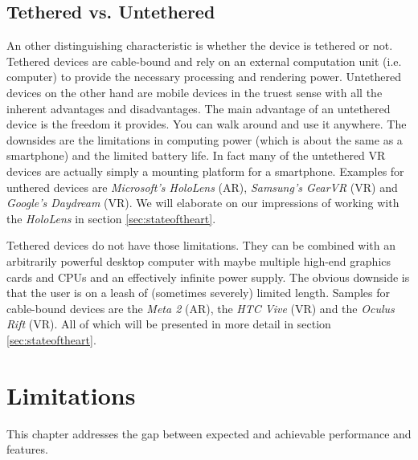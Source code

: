 \documentclass[11pt, a4paper]{IEEEtran}
\begin{document}
\subsection{Tethered vs. Untethered}
An other distinguishing characteristic is whether the device is tethered or not. Tethered devices are cable-bound and rely on an external computation unit (i.e. computer) to provide the necessary processing and rendering power. Untethered devices on the other hand are mobile devices in the truest sense with all the inherent advantages and disadvantages. The main advantage of an untethered device is the freedom it provides. You can walk around and use it anywhere. The downsides are the limitations in computing power (which is about the same as a smartphone) and the limited battery life. In fact many of the untethered VR devices are actually simply a mounting platform for a smartphone. Examples for unthered devices are \textit{Microsoft's HoloLens} (AR), \textit{Samsung's GearVR} (VR) and \textit{Google's Daydream} (VR). We will elaborate on our impressions of working with the \textit{HoloLens} in section \ref{sec:stateoftheart}.

Tethered devices do not have those limitations. They can be combined with an arbitrarily powerful desktop computer with maybe multiple high-end graphics cards and CPUs and an effectively infinite power supply. The obvious downside is that the user is on a leash of (sometimes severely) limited length. Samples for cable-bound devices are the \textit{Meta 2} (AR), the \textit{HTC Vive} (VR) and the \textit{Oculus Rift} (VR). All of which will be presented in more detail in section \ref{sec:stateoftheart}.

\section{Limitations}\label{sec:limitations}
This chapter addresses the gap between expected and achievable performance and features.
\end{document}
